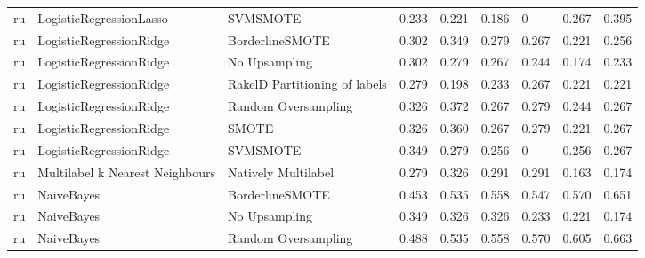 \begin{tabular}{lllllllll}
      ru &         LogisticRegressionLasso &                      SVMSMOTE & 0.233 &                     0.221 &                 0.186 &                      0 &                                   0.267 &     0.395 \\
      ru &         LogisticRegressionRidge &               BorderlineSMOTE & 0.302 &                     0.349 &                 0.279 &                  0.267 &                                   0.221 &     0.256 \\
      ru &         LogisticRegressionRidge &                 No Upsampling & 0.302 &                     0.279 &                 0.267 &                  0.244 &                                   0.174 &     0.233 \\
      ru &         LogisticRegressionRidge & RakelD Partitioning of labels & 0.279 &                     0.198 &                 0.233 &                  0.267 &                                   0.221 &     0.221 \\
      ru &         LogisticRegressionRidge &           Random Oversampling & 0.326 &                     0.372 &                 0.267 &                  0.279 &                                   0.244 &     0.267 \\
      ru &         LogisticRegressionRidge &                         SMOTE & 0.326 &                     0.360 &                 0.267 &                  0.279 &                                   0.221 &     0.267 \\
      ru &         LogisticRegressionRidge &                      SVMSMOTE & 0.349 &                     0.279 &                 0.256 &                      0 &                                   0.256 &     0.267 \\
      ru & Multilabel k Nearest Neighbours &           Natively Multilabel & 0.279 &                     0.326 &                 0.291 &                  0.291 &                                   0.163 &     0.174 \\
      ru &                      NaiveBayes &               BorderlineSMOTE & 0.453 &                     0.535 &                 0.558 &                  0.547 &                                   0.570 &     0.651 \\
      ru &                      NaiveBayes &                 No Upsampling & 0.349 &                     0.326 &                 0.326 &                  0.233 &                                   0.221 &     0.174 \\
      ru &                      NaiveBayes &           Random Oversampling & 0.488 &                     0.535 &                 0.558 &                  0.570 &                                   0.605 &     0.663 \\

\end{tabular}
